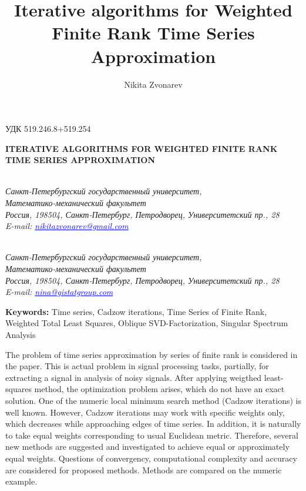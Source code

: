 \documentclass[12pt,a4paper,fleqn,leqno]{article}
\author{Nikita Zvonarev}
\title{Iterative algorithms for Weighted Finite Rank Time Series  Approximation}
\begin{document}
\noindent УДК 519.246.8+519.254

\begin{center}{
\fontsize{18pt}{23pt}\selectfont\bf%
  \MakeUppercase{
 Iterative algorithms for Weighted Finite Rank Time Series Approximation
}}
\end{center}

\begin{center}{\bpv{}\\
\footnotesize\it Санкт-Петербургский государственный университет,\\
Математико-механический факультет
\\
\rm
Россия, 198504, Санкт-Петербург, Петродворец, Университетский пр., 28\\
E-mail: \textcolor {blue}{\underline{nikitazvonarev@gmail.com}}}
\end{center}
\begin{center}{\\
\footnotesize\it Санкт-Петербургский государственный университет,\\
Математико-механический факультет
\\
\rm
Россия, 198504, Санкт-Петербург, Петродворец, Университетский пр., 28\\
E-mail: \textcolor {blue}{\underline{nina@gistatgroup.com}}}
\end{center}
\hspace{1.25cm}\begin{minipage}{12.16cm}\bpv\bpv\bmv \noindent
\footnotesize{\bf Keywords:}\/ Time series, Cadzow iterations, Time Series of Finite Rank, Weighted Total Least Squares, Oblique SVD-Factorization, Singular Spectrum Analysis

\bpv\bpv\noindent  The problem of time series approximation by series of finite rank is considered in the paper. This is actual problem in signal processing tasks, partially, for extracting a signal in analysis of noisy signals. After applying weigthed least-squares method, the optimization problem arises, which do not have an exact solution. One of the numeric local minimum search method (Cadzow iterations) is well known. However, Cadzow iterations may work with specific weights only, which decreases while approaching edges of time series. In addition, it is naturally to take equal weights corresponding to usual Euclidean metric. Therefore, several new methods are suggested and investigated to achieve equal or approximately equal weights. Questions of convergency, computational complexity and accuracy are considered for proposed methods. Methods are compared on the numeric example.

\end{minipage}\bls\bmv
\end{document}
